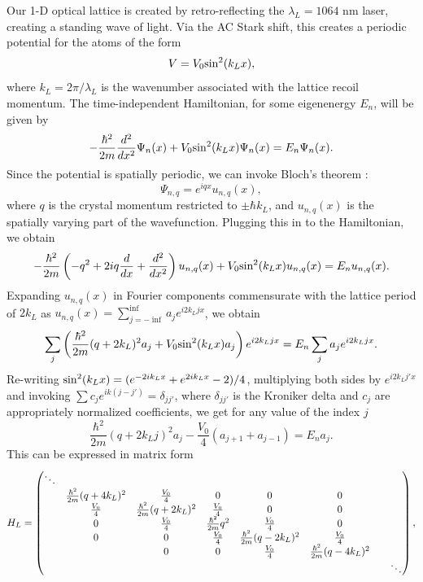 	Our 1-D optical lattice is created by retro-reflecting the  $\lambda_L = 1064 $ nm laser, creating a standing wave of light. Via the AC Stark shift, this creates a periodic potential for the atoms of the form
\begin{equation}
V = V_0 {\rm sin}^2 (k_L x),
\end{equation} 
where $k_L = 2\pi/\lambda_L$ is the wavenumber associated with the lattice recoil momentum. The time-independent Hamiltonian, for some eigenenergy $E_n$, will be given by
\begin{equation}
-\frac{\hbar^2}{2 m}\frac{d^2}{dx^2}\Psi_n(x)+V_0 {\rm sin}^2 (k_L x) \Psi_n(x) = E_n \Psi_n(x).
\end{equation}
Since the potential is spatially periodic, we can invoke Bloch's theorem \cite{Ashcroft}:
\begin{equation}
\Psi_{n,q} =  e^{iqx}u_{n,q}(x), 
\end{equation}
where $q$ is the crystal momentum restricted to $\pm\hbar k_L$, and $u_{n,q}(x)$ is the spatially varying part of the wavefunction. 
Plugging this in to the Hamiltonian, we obtain
\begin{equation}
-\frac{\hbar^2}{2m}\left(-q^2 + 2iq\frac{d}{dx} + \frac{d^2}{dx^2}\right) u_{n,q}(x) + V_0{\rm sin}^2(k_L x) u_{n,q}(x) = E_n u_{n,q}(x).
\end{equation}
Expanding $u_{n,q}(x)$  in Fourier components commensurate with the lattice period of $2 k_L$ as $u_{n,q}(x) = \sum_{j=-\inf}^{\inf} a_j e^{i 2 k_L j x}$, we obtain
\begin{equation}
\sum_j \left(\frac{\hbar^2}{2m}(q + 2 k_L)^2 a_j + V_0 {\rm sin}^2(k_L x) a_j\right) e^{i 2 k_L j x} = E_n\sum_j a_j  e^{i 2 k_L j x}.
\end{equation}
Re-writing ${\rm sin}^2(k_L x) = (e^{-2ik_L x} + e^{2 i k_L x} - 2)/4$, multiplying both sides by $e^{i 2 k_L j' x}$ and invoking $\sum c_j e^{i k (j-j')} = \delta_{jj'}$, where $\delta_{j j'}$ is the Kroniker delta and $c_j$ are appropriately normalized coefficients, we get for any value of the index $j$
\begin{equation}
\frac{\hbar^2}{2m}(q + 2 k_L j)^2 a_j - \frac{V_0}{4}(a_{j+1}+a_{j-1}) = E_n a_j.
\end{equation}
This can be expressed in matrix form
\begin{equation}
H_L =
 \begin{pmatrix} \ddots &  & & & & & & \\ 
 & \frac{\hbar^2}{2m}(q + 4 k_L )^2 & \frac{V_0}{4} & 0 & 0 & 0 &  \\
 & \frac{V_0}{4} &\frac{\hbar^2}{2m}(q + 2 k_L )^2 & \frac{V_0}{4} & 0 & 0 &  \\
& 0 & \frac{V_0}{4} & \frac{\hbar^2}{2m}q^2 & \frac{V_0}{4} & 0 &  \\
 & 0 & 0 & \frac{V_0}{4} & \frac{\hbar^2}{2m}(q - 2 k_L)^2 &\frac{V_0}{4} &  \\
 &  & 0 & 0 & \frac{V_0}{4} & \frac{\hbar^2}{2m}(q - 4 k_L)^2 &  \\
& & & & & & &  \ddots \end{pmatrix} \\,
\label{eqn:LatHam}
\end{equation}
